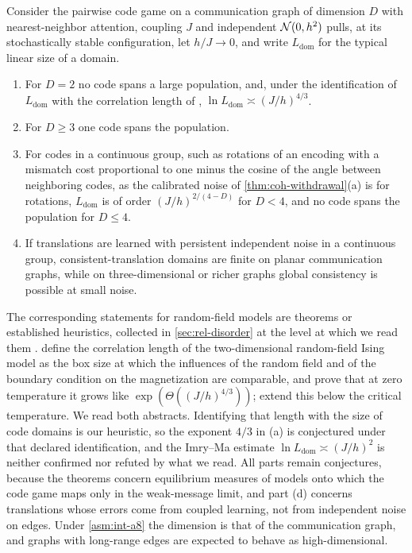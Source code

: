\begin{conjecture}\label{conj:coh-imry-ma}
Consider the pairwise code game on a communication graph of dimension $D$ with nearest-neighbor attention, coupling $J$ and independent $\mathcal{N}(0,h^2)$ pulls, at its stochastically stable configuration, let $h/J\to0$, and write $L_{\mathrm{dom}}$ for the typical linear size of a domain.
\begin{enumerate}\renewcommand{\labelenumi}{(\alph{enumi})}
\item For $D=2$ no code spans a large population, and, under the identification of $L_{\mathrm{dom}}$ with the correlation length of \citet{ding2023correlation}, $\ln L_{\mathrm{dom}}\asymp(J/h)^{4/3}$.
\item For $D\ge3$ one code spans the population.
\item For codes in a continuous group, such as rotations of an encoding with a mismatch cost proportional to one minus the cosine of the angle between neighboring codes, as the calibrated noise of \cref{thm:coh-withdrawal}(a) is for rotations, $L_{\mathrm{dom}}$ is of order $(J/h)^{2/(4-D)}$ for $D<4$, and no code spans the population for $D\le4$.
\item If translations are learned with persistent independent noise in a continuous group, consistent-translation domains are finite on planar communication graphs, while on three-dimensional or richer graphs global consistency is possible at small noise.
\end{enumerate}
\end{conjecture}

The corresponding statements for random-field models are theorems or established heuristics, collected in \cref{sec:rel-disorder} at the level at which we read them \citep{imry1975random,aizenman1989rounding,aizenman1990rounding,bricmont1988phase,abbe2018group}. \citet{ding2023correlation} define the correlation length of the two-dimensional random-field Ising model as the box size at which the influences of the random field and of the boundary condition on the magnetization are comparable, and prove that at zero temperature it grows like $\exp(\Theta((J/h)^{4/3}))$; \citet{ding2026phase} extend this below the critical temperature. We read both abstracts. Identifying that length with the size of code domains is our heuristic, so the exponent $4/3$ in (a) is conjectured under that declared identification, and the Imry--Ma estimate $\ln L_{\mathrm{dom}}\asymp(J/h)^2$ is neither confirmed nor refuted by what we read. All parts remain conjectures, because the theorems concern equilibrium measures of models onto which the code game maps only in the weak-message limit, and part (d) concerns translations whose errors come from coupled learning, not from independent noise on edges. Under \cref{asm:int-a8} the dimension is that of the communication graph, and graphs with long-range edges are expected to behave as high-dimensional.

